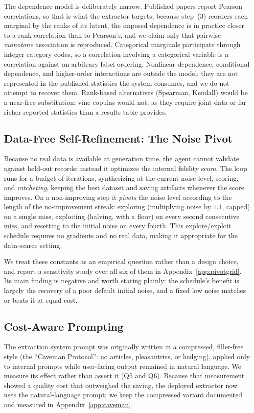 \documentclass[letterpaper]{article} %
\begin{document}
The dependence model is deliberately narrow. Published papers report Pearson
correlations, so that is what the extractor targets; because step~(3) reorders
each marginal by the ranks of its latent, the imposed dependence is in practice
closer to a rank correlation than to Pearson's, and we claim only that pairwise
\emph{monotone} association is reproduced. Categorical marginals participate
through integer category codes, so a correlation involving a categorical
variable is a correlation against an arbitrary label ordering. Nonlinear
dependence, conditional dependence, and higher-order interactions are outside
the model: they are not represented in the published statistics the system
consumes, and we do not attempt to recover them. Rank-based alternatives
(Spearman, Kendall) would be a near-free substitution; vine copulas would not,
as they require joint data or far richer reported statistics than a results
table provides.

\subsection{Data-Free Self-Refinement: The Noise Pivot}
Because no real data is available at generation time, the agent cannot validate
against held-out records; instead it optimizes the internal fidelity score. The
loop runs for a budget of iterations, synthesizing at the current noise level,
scoring, and \emph{ratcheting}, keeping the best dataset and saving artifacts
whenever the score improves. On a non-improving step it \emph{pivots} the noise
level according to the length of the no-improvement streak: exploring
(multiplying noise by $1.1$, capped) on a single miss, exploiting (halving, with
a floor) on every second consecutive miss, and resetting to the initial noise on
every fourth. This explore/exploit schedule requires no gradients and no real
data, making it appropriate for the data-scarce setting.

We treat these constants as an empirical question rather than a design choice,
and report a sensitivity study over all six of them in
Appendix~\ref{app:pivotgrid}. Its main finding is negative and worth stating
plainly: the schedule's benefit is largely the recovery of a poor default
initial noise, and a fixed low noise matches or beats it at equal cost.

\subsection{Cost-Aware Prompting}
The extraction system prompt was originally written in a compressed, filler-free
style (the ``Caveman Protocol'': no articles, pleasantries, or hedging), applied
only to internal prompts while user-facing output remained in natural language.
We measure its effect rather than assert it (Q5 and Q6). Because that measurement
showed a quality cost that outweighed the saving, the deployed extractor now uses
the natural-language prompt; we keep the compressed variant documented and
measured in Appendix~\ref{app:caveman}.
\end{document}
